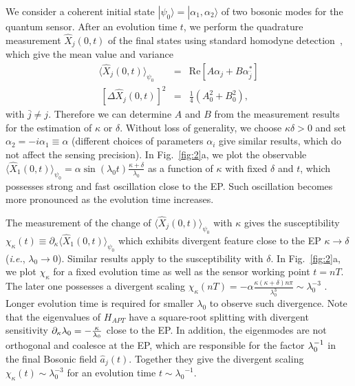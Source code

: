 \documentclass[twocolumn,prl,floatfix,citeautoscript,nofootinbib,superscriptaddress]{revtex4}
\begin{document}
We consider a coherent initial state $|\psi _{0}\rangle =|\alpha _{1},\alpha
_{2}\rangle $ of two bosonic modes for the quantum sensor. After an
evolution time $t$, we perform the quadrature measurement $\hat{X}_{j}(0,t)$
of the final states using standard homodyne detection~\cite%
{Quantum.Measurement}, which give the mean value and variance
\begin{eqnarray}
\langle \hat{X}_{j}(0,t)\rangle _{\psi _{0}} &=&\mathrm{Re}[A\alpha
_{j}+B\alpha _{\bar{j}}^{\ast }] \\
\ [\Delta \hat{X}_{j}(0,t)]^{2} &=&\frac{1}{4}(A_{0}^{2}+B_{0}^{2}),
\end{eqnarray}%
with $\bar{j}\neq j$. Therefore we can determine $A$ and $B$ from the
measurement results for the estimation of $\kappa $ or $\delta $. Without
loss of generality, we choose $\kappa \delta >0$
and set $\alpha _{2}=-i\alpha _{1}\equiv \alpha $ (different choices of
parameters $\alpha _{i}$ give similar results, which do not affect the
sensing precision). In Fig.~\ref{fig:2}a, we plot the observable $\langle
\hat{X}_{1}(0,t)\rangle _{\psi _{0}}=\alpha \sin (\lambda _{0}t)\frac{\kappa
+\delta }{\lambda _{0}}$ as a function of $\kappa $ with fixed $\delta $ and
$t$, which possesses strong and fast oscillation close to the EP. Such
oscillation becomes more pronounced as the evolution time increases.

The measurement of the change of $\langle \hat{X}_{j}(0,t)\rangle _{\psi
_{0}}$ with $\kappa $ gives the susceptibility $\chi _{\kappa }(t)\equiv
\partial _{\kappa }\langle \hat{X}_{1}(0,t)\rangle _{\psi _{0}}$
which exhibits divergent feature close to the EP $\kappa \rightarrow \delta $
(\textit{i.e.}, $\lambda _{0}\rightarrow 0$). Similar results apply to the
susceptibility with $\delta $. In Fig.~\ref{fig:2}a, we plot $\chi _{\kappa
} $ for a fixed evolution time as well as the sensor working point $t=nT$.
The later one possesses a divergent scaling $\chi _{\kappa }(nT)=-\alpha
\frac{\kappa (\kappa +\delta )n\pi }{\lambda _{0}^{3}}\sim \lambda _{0}^{-3}$%
. Longer evolution time is required for smaller $\lambda _{0}$ to observe
such divergence. Note that the eigenvalues of $H_{APT}$ have a square-root
splitting with divergent sensitivity $\partial _{\kappa }\lambda _{0}=-\frac{%
\kappa }{\lambda _{0}}$ close to the EP. In addition, the eigenmodes are not
orthogonal and coalesce at the EP, which are responsible for the factor ${%
\lambda _{0}^{-1}}$ in the final Bosonic field $\hat{a}_{j}(t)$. Together
they give the divergent scaling $\chi _{\kappa }(t)\sim \lambda _{0}^{-3}$
for an evolution time $t\sim {\lambda _{0}}^{-1}$.
\end{document}
